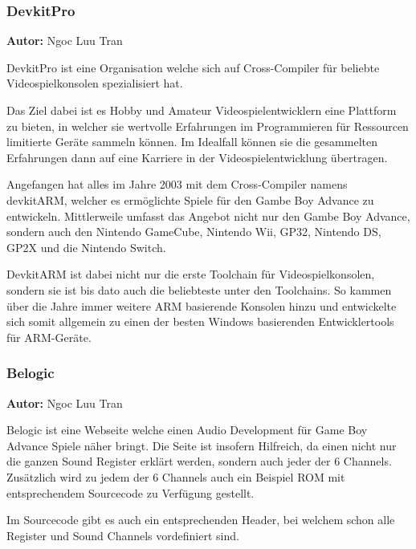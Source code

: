 \documentclass[11pt,a4paper]{scrartcl}
\newcommand{\AutorNgoc} {
    \vspace{-4mm}
    \large \textbf{Autor:} Ngoc Luu Tran \normalsize
    \vspace{2mm}
}
\begin{document}

\subsubsection{DevkitPro}
\AutorNgoc

DevkitPro ist eine Organisation welche sich auf Cross-Compiler f\"ur beliebte Videospielkonsolen spezialisiert hat.

Das Ziel dabei ist es Hobby und Amateur Videospielentwicklern eine Plattform zu bieten, in welcher sie wertvolle Erfahrungen im Programmieren f\"ur Ressourcen limitierte Ger\"ate sammeln k\"onnen. Im Idealfall k\"onnen sie die gesammelten Erfahrungen dann auf eine Karriere in der Videospielentwicklung \"ubertragen.

Angefangen hat alles im Jahre 2003 mit dem Cross-Compiler namens devkitARM, welcher es erm\"oglichte Spiele f\"ur den Gambe Boy Advance zu entwickeln. Mittlerweile umfasst das Angebot nicht nur den Gambe Boy Advance, sondern auch den Nintendo GameCube, Nintendo Wii, GP32, Nintendo DS, GP2X und die Nintendo Switch. 

DevkitARM ist dabei nicht nur die erste Toolchain f\"ur Videospielkonsolen, sondern sie ist bis dato auch die beliebteste unter den Toolchains. So kammen \"uber die Jahre immer weitere ARM basierende Konsolen hinzu und entwickelte sich somit allgemein zu einen der besten Windows basierenden Entwicklertools f\"ur ARM-Ger\"ate. 


\subsubsection{Belogic}
\AutorNgoc
 
Belogic ist eine Webseite welche einen Audio Development f\"ur Game Boy Advance Spiele n\"aher bringt. Die Seite ist insofern Hilfreich, da einen nicht nur die ganzen Sound Register erkl\"art werden, sondern auch jeder der 6 Channels. Zus\"atzlich wird zu jedem der 6 Channels auch ein Beispiel ROM mit entsprechendem Sourcecode zu Verf\"ugung gestellt.

Im Sourcecode gibt es auch ein entsprechenden Header, bei welchem schon alle Register und Sound Channels vordefiniert sind.
\end{document}
